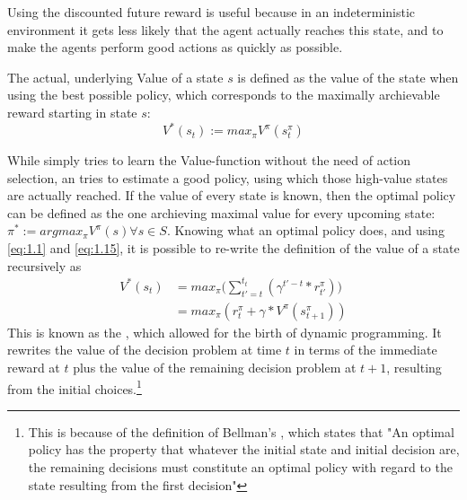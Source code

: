 Using the discounted future reward is useful because in an indeterministic environment it gets less likely that the agent actually reaches this state, and to make the agents perform good actions as quickly as possible.

The actual, underlying Value of a state $s$ is defined as the value of the state when using the best possible policy, which corresponds to the maximally archievable reward starting in state $s$:
\begin{equation} \label{eq:1.15}
V^*(s_t) := max_\pi V^\pi(s_t^\pi)
\end{equation}

While  simply tries to learn the Value-function without the need of action selection, an  tries to estimate a good policy, using which those high-value states are actually reached. If the value of every state is known, then the optimal policy can be defined as the one archieving maximal value for every upcoming state: \mbox{$\pi^* := argmax_\pi V^\pi(s) \forall s \in S$}. Knowing what an optimal policy does, and using \ref{eq:1.1} and \ref{eq:1.15}, it is possible to re-write the definition of the value of a state recursively as 
\begin{align}
V^*(s_t) &= max_\pi \Big(\sum_{t'=t}^{t_t} ( \gamma^{t'-t} * r^\pi_{t'} )\Big) \label{eq:1.16}\\
&= max_\pi (r^\pi_t + \gamma * V^\pi(s_{t+1}^\pi)) \label{bellman}
\end{align}
This is known as the , which allowed for the birth of dynamic programming. It rewrites the value of the decision problem at time $t$ in terms of the immediate reward at $t$ plus the value of the remaining decision problem at $t+1$, resulting from the initial choices.\footnote{This is because of the definition of Bellman's , which states that "An optimal policy has the property that whatever the initial state and initial decision are, the remaining decisions must constitute an optimal policy with regard to the state resulting from the first decision\cite{Bellman1957}"}

